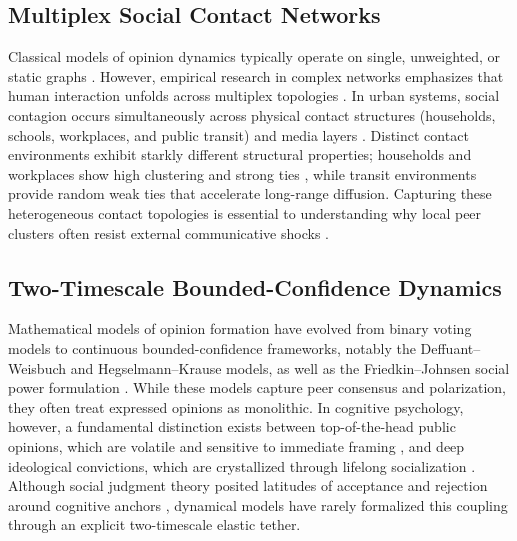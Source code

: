\documentclass[a4paper,fleqn]{cas-dc}
\begin{document}
\subsection{Multiplex Social Contact Networks}
Classical models of opinion dynamics typically operate on single, unweighted, or static graphs \citep{castellano2009statistical, hegselmann2002opinion}. However, empirical research in complex networks emphasizes that human interaction unfolds across multiplex topologies \citep{boccaletti2014structure, kivela2014multilayer}. In urban systems, social contagion occurs simultaneously across physical contact structures (households, schools, workplaces, and public transit) and media layers \citep{lopes2022measuring}. Distinct contact environments exhibit starkly different structural properties; households and workplaces show high clustering and strong ties \citep{granovetter1973strength}, while transit environments provide random weak ties that accelerate long-range diffusion. Capturing these heterogeneous contact topologies is essential to understanding why local peer clusters often resist external communicative shocks \citep{mcpherson2001birds}.

\subsection{Two-Timescale Bounded-Confidence Dynamics}
Mathematical models of opinion formation have evolved from binary voting models to continuous bounded-confidence frameworks, notably the Deffuant--Weisbuch \citep{deffuant2000mixing} and Hegselmann--Krause \citep{hegselmann2002opinion} models, as well as the Friedkin--Johnsen social power formulation \citep{friedkin1990social, friedkin2016network}. While these models capture peer consensus and polarization, they often treat expressed opinions as monolithic. In cognitive psychology, however, a fundamental distinction exists between top-of-the-head public opinions, which are volatile and sensitive to immediate framing \citep{zaller1992nature}, and deep ideological convictions, which are crystallized through lifelong socialization \citep{converse1964nature, howe2017attitude, kiley2020measuring}. Although social judgment theory posited latitudes of acceptance and rejection around cognitive anchors \citep{sherif1961social}, dynamical models have rarely formalized this coupling through an explicit two-timescale elastic tether.
\end{document}

